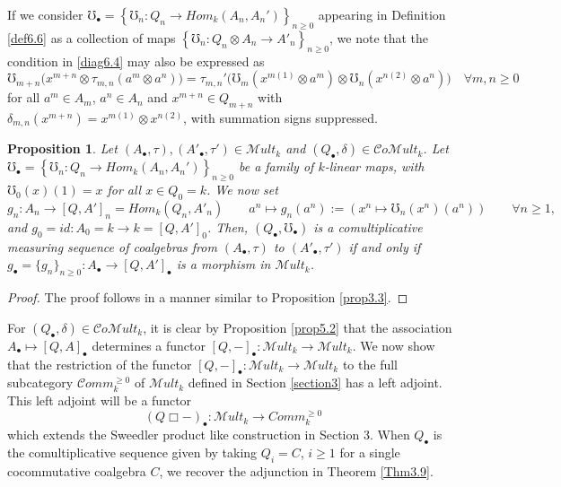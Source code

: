 \documentclass[10pt, colorlinks]{article}
\numberwithin{equation}{section} \DeclareMathSizes{2}{10}{12}{13}
\newtheorem{thm}{Proposition}[section]
\begin{document}
    If we consider $\mho_\bullet=\left\{\mho_n:Q_n\longrightarrow  {Hom}_k(A_n,A_n')\right\}_{n\geq 0}$ appearing in Definition \ref{def6.6}  as a collection of maps $\left\{\mho_n:Q_n\otimes A_n\longrightarrow A'_n\right\}_{n\geq 0}$, we note that the condition in \eqref{diag6.4} may also be expressed as
    \begin{equation}\label{diag4prm2}
        \mho_{m+n}\big(x^{m+n}\otimes\tau_{m,n}(a^m\otimes a^n)\big)= \tau_{m,n}'\Big(\mho_m(x^{m(1)}\otimes a^m)\otimes\mho_n(x^{n(2)}\otimes a^n)\Big)\quad \forall m,n\geq 0
    \end{equation}
    for all  $a^m\in A_m$, $a^n\in A_n$ and $x^{m+n}\in Q_{m+n}$ with $\delta_{m,n}(x^{m+n})=x^{m(1)}\otimes x^{n(2)}$, with summation signs suppressed. 


         

        
        \begin{thm}\label{prop6.7}
        Let $(A_\bullet,\tau),(A'_\bullet,\tau')\in\mathscr Mult_k$ and $(Q_\bullet,\delta)\in \mathcal Co\mathscr Mult_k$. Let $\mho_\bullet=\left\{\mho_n:Q_n\longrightarrow  {Hom}_k(A_n,A_n')\right\}_{n\geq 0}$ be a family of $k$-linear maps, with $\mho_0(x)(1)=x$ for all $x\in Q_0=k$. We now set
        \begin{equation}\label{eq6.5}
        g_n:A_n\longrightarrow [Q,A']_n= {Hom}_k(Q_n, A'_n)\qquad a^n\longmapsto g_n(a^n):=\left(x^n\longmapsto \mho_n(x^n)(a^n)\right)\qquad\forall n\geq1,
    \end{equation}
    and $g_0=id:A_0=k\longrightarrow k=[Q,A']_0$.
    Then, $(Q_\bullet,\mho_\bullet)$ is a comultiplicative measuring sequence of coalgebras  from $(A_\bullet,\tau)$ to $(A'_\bullet,\tau')$ if and only if $g_\bullet=\{g_n\}_{n\geq0}: A_\bullet\longrightarrow  [Q, A']_\bullet$ is a morphism in $\mathscr Mult_k$.
    \end{thm}


    
    \begin{proof}
       The proof follows in a manner similar to Proposition \ref{prop3.3}.  

    \end{proof}

\smallskip

For $(Q_\bullet,\delta)\in \mathcal Co\mathscr Mult_k$, it is clear by Proposition \ref{prop5.2} that  the association $A_\bullet\longmapsto [Q,A]_\bullet$ determines a functor $[Q,-]_\bullet:\mathscr Mult_k\longrightarrow \mathscr Mult_k$. We now show that the restriction of the functor $[Q,-]_\bullet:\mathscr Mult_k\longrightarrow \mathscr Mult_k$ to the full subcategory $\mathcal Comm_k^{\geq 0}$ of $\mathscr Mult_k$ defined in Section \ref{section3} has a left adjoint. This left adjoint will be a functor 
\begin{equation}
(Q\Box-)_\bullet:\mathscr Mult_k\longrightarrow Comm_k^{\geq 0}
\end{equation} which extends the Sweedler product like construction in Section 3.  When $Q_\bullet$ is the comultiplicative sequence given by taking $Q_i=C$, $i\geq 1$ for a single cocommutative coalgebra $C$, we recover the adjunction in Theorem \ref{Thm3.9}. 
\end{document}
